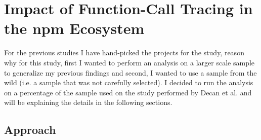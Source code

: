 \chapter{Impact of Function-Call Tracing in the npm Ecosystem}
\label{sec:impact_study}

For the previous studies I have hand-picked the projects for the study, reason why for this study, first I wanted to perform an analysis on a larger scale sample to generalize my previous findings and second, I wanted to use a sample from the wild (i.e. a sample that was not carefully selected).  
I decided to run the analysis on a percentage of the sample used on the study performed by Decan et al. \cite{decan2018impact} and will be explaining the details in the following sections.

\section{Approach}

